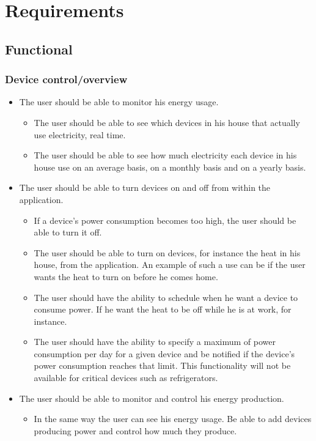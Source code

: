 \section{Requirements}
\subsection{Functional}

\subsubsection{Device control/overview}
\begin{itemize}
\item The user should be able to monitor his energy usage.
\begin{itemize}
\item The user should be able to see which devices in his house that actually use electricity, real time.
\item The user should be able to see how much electricity each device in his house use on an average basis, on a monthly basis and on a yearly basis.
\end{itemize}

\item The user should be able to turn devices on and off from within the application.
\begin{itemize}
\item If a device's power consumption becomes too high, the user should be able to turn it off.
\item The user should be able to turn on devices, for instance the heat in his house, from the application. An example of such a use can be if the user wants the heat to turn on before he comes home.
\item The user should have the ability to schedule when he want a device to consume power. If he want the heat to be off while he is at work, for instance. 
\item The user should have the ability to specify a maximum of power 
consumption per day for a given device and be notified if the device's power
consumption reaches that limit. This functionality will not be available
for critical devices such as refrigerators. 
\end{itemize}

\item The user should be able to monitor and control his energy production.
\begin{itemize}
\item In the same way the user can see his energy usage. Be able to add devices producing power and control how much they produce.
\end{itemize}
\end{itemize}

